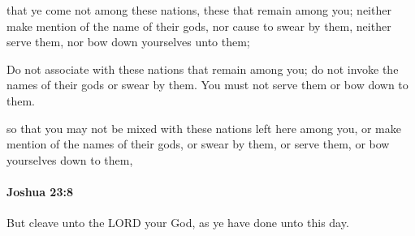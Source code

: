 			\begin{versebox}
					\item[BHS] 
					\item[ASV] that ye come not among these nations, these that remain among you; neither make mention of the name of their gods, nor cause to swear by them, neither serve them, nor bow down yourselves unto them;
					\item[NIV] Do not associate with these nations that remain among you; do not invoke the names of their gods or swear by them. You must not serve them or bow down to them.
					\item[NRSV] so that you may not be mixed with these nations left here among you, or make mention of the names of their gods, or swear by them, or serve them, or bow yourselves down to them,
			\end{versebox}

		\paragraph{Joshua 23:8} %
			\label{JOSHUA-23-8}

			But cleave unto the LORD your God, as ye have done unto this day.

